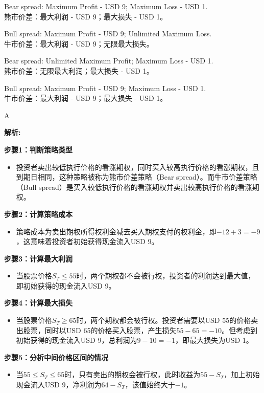 \documentclass{article}
\newenvironment{explanation}
{\textbf{解析:}\par}
{\par}
\begin{document}
    \begin{choices}
        \item Bear spread: Maximum Profit - USD 9; Maximum Loss - USD 1.\\
        熊市价差：最大利润 - USD 9；最大损失 - USD 1。
        \item Bull spread: Maximum Profit - USD 9; Unlimited Maximum Loss.\\
        牛市价差：最大利润 - USD 9；无限最大损失。
        \item Bear spread: Unlimited Maximum Profit; Maximum Loss - USD 1.\\
        熊市价差：无限最大利润；最大损失 - USD 1。
        \item Bull spread: Maximum Profit - USD 9; Maximum Loss - USD 1.\\
        牛市价差：最大利润 - USD 9；最大损失 - USD 1。
    \end{choices}
    
    \begin{correctanswer}
        A
    \end{correctanswer}
    
    \begin{explanation}
    \textbf{步骤1：判断策略类型}
    \begin{itemize}
    \item 投资者卖出较低执行价格的看涨期权，同时买入较高执行价格的看涨期权，且到期日相同，这种策略被称为熊市价差策略（Bear spread）。而牛市价差策略（Bull spread）是买入较低执行价格的看涨期权并卖出较高执行价格的看涨期权。
    \end{itemize}
    \textbf{步骤2：计算策略成本}
    \begin{itemize}
    \item 策略成本为卖出期权所得权利金减去买入期权支付的权利金，即\(-12 + 3=-9\)，这意味着投资者初始获得现金流入USD 9。
    \end{itemize}
    \textbf{步骤3：计算最大利润}
    \begin{itemize}
    \item 当股票价格\(S_T\leq55\)时，两个期权都不会被行权，投资者的利润达到最大值，即初始获得的现金流入USD 9。
    \end{itemize}
    \textbf{步骤4：计算最大损失}
    \begin{itemize}
    \item 当股票价格\(S_T\geq65\)时，两个期权都会被行权。投资者需要以USD 55的价格卖出股票，同时以USD 65的价格买入股票，产生损失\(55 - 65=-10\)。但考虑到初始获得的现金流入USD 9，总利润为\(9-10 = - 1\)，即最大损失为USD 1。
    \end{itemize}
    \textbf{步骤5：分析中间价格区间的情况}
    \begin{itemize}
    \item 当\(55\leq S_T\leq65\)时，只有卖出的期权会被行权，此时收益为\(55 - S_T\)，加上初始现金流入USD 9，净利润为\(64 - S_T\)，该值始终大于\(-1\)。
    \end{itemize}
    \end{explanation}
    
\end{document}
